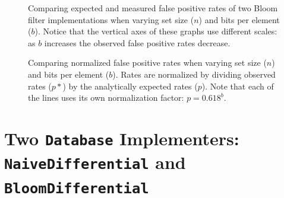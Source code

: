 \documentclass{article}
\begin{document}
\begin{figure}[h]
  \caption{Comparing expected and measured false positive rates of two Bloom
           filter implementations when varying set size ($n$) and
           bits per element ($b$). Notice that the vertical axes of these graphs
           use different scales: as $b$ increases the observed false positive
           rates decrease.}
  \label{fig:false_positives}
\end{figure}

\begin{figure}[h]
  \caption{Comparing normalized false positive rates when varying set size ($n$)
           and bits per element ($b$). Rates are normalized by dividing observed
           rates ($p*$) by the analytically expected rates ($p$). Note that each
           of the lines uses its own normalization factor: $p = 0.618^b$.}
  \label{fig:normalized_false_positives}
\end{figure}


\section{Two \texttt{Database} Implementers: \texttt{NaiveDifferential} and
         \texttt{BloomDifferential}}
\end{document}
